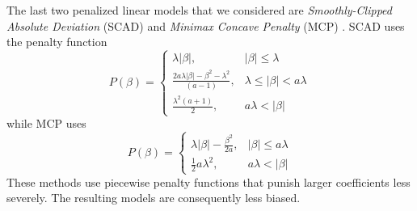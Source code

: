 \documentclass{article}
\begin{document}
	The last two penalized linear models that we considered are \textit{Smoothly-Clipped Absolute Deviation} (SCAD) and \textit{Minimax Concave Penalty} (MCP) \cite{fan2001variable, wang2007group, zhang2010nearly}. SCAD uses the penalty function
	\begin{equation}
		P(\beta) = \left\{\begin{array}{ll}
				\lambda \vert \beta \vert, & \vert \beta \vert \leq \lambda \\
				\frac{2a\lambda\vert\beta\vert - \beta^2 - \lambda^2}{(a - 1)}, & \lambda \leq \vert \beta \vert < a\lambda \\
				\frac{\lambda^2(a+1)}{2}, & a\lambda < \vert \beta \vert
			\end{array}\right.
	\end{equation}
	while MCP uses
	\begin{equation}
		P(\beta) = \left\{\begin{array}{ll}
			\lambda\vert \beta \vert - \frac{\beta^2}{2a}, & \vert \beta \vert \leq a\lambda \\
			\frac{1}{2}a\lambda^2, & a\lambda < \vert \beta \vert
		\end{array}\right.
	\end{equation}
	These methods use piecewise penalty functions that punish larger coefficients less severely. The resulting models are consequently less biased. 
\end{document}
